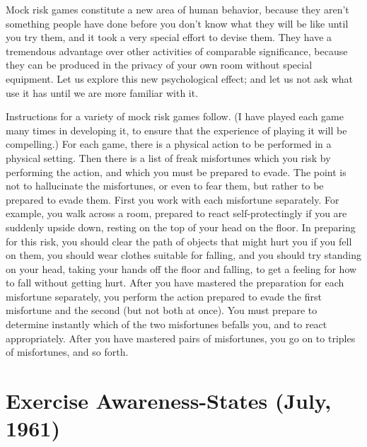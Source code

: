 Mock risk games constitute a new area of human behavior, because they 
aren't something people have done before you don't know what they will be 
like until you try them, and it took a very special effort to devise them. They 
have a tremendous advantage over other activities of comparable 
significance, because they can be produced in the privacy of your own room 
without special equipment. Let us explore this new psychological effect; and 
let us not ask what use it has until we are more familiar with it. 

Instructions for a variety of mock risk games follow. (I have played each 
game many times in developing it, to ensure that the experience of playing 
it will be compelling.) For each game, there is a physical action to be 
performed in a physical setting. Then there is a list of freak misfortunes 
which you risk by performing the action, and which you must be prepared 
to evade. The point is not to hallucinate the misfortunes, or even to fear 
them, but rather to be prepared to evade them. First you work with each 
misfortune separately. For example, you walk across a room, prepared to 
react self-protectingly if you are suddenly upside down, resting on the top 
of your head on the floor. In preparing for this risk, you should clear the path 
of objects that might hurt you if you fell on them, you should wear clothes 
suitable for falling, and you should try standing on your head, taking your 
hands off the floor and falling, to get a feeling for how to fall without getting 
hurt. After you have mastered the preparation for each misfortune 
separately, you perform the action prepared to evade the first misfortune and the 
second (but not both at once). You must prepare to determine instantly 
which of the two misfortunes befalls you, and to react appropriately. After 
you have mastered pairs of misfortunes, you go on to triples of misfortunes, 
and so forth. 

\section*{Exercise Awareness-States (July, 1961)}

